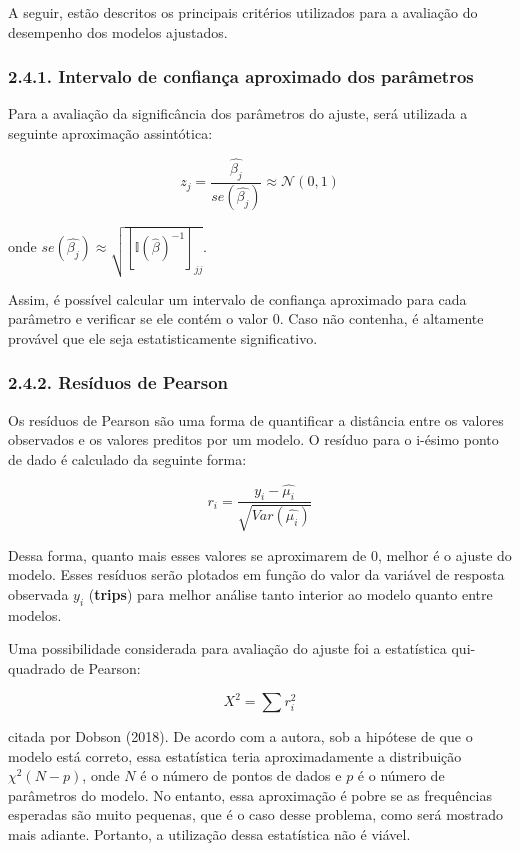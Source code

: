 \documentclass[
]{article}
\begin{document}
A seguir, estão descritos os principais critérios utilizados para a
avaliação do desempenho dos modelos ajustados.

\subsubsection{2.4.1. Intervalo de confiança aproximado dos
parâmetros}\label{intervalo-de-confianuxe7a-aproximado-dos-paruxe2metros}

Para a avaliação da significância dos parâmetros do ajuste, será
utilizada a seguinte aproximação assintótica:

\[
z_j = \dfrac{\hat{\beta_j}}{se(\hat{\beta_j})} \approx \mathcal{N}(0, 1)
\]

onde
\(se(\hat{\beta_j}) \approx \sqrt{[\mathbb{I}(\hat{\beta})^{-1}]_{jj}}\).

Assim, é possível calcular um intervalo de confiança aproximado para
cada parâmetro e verificar se ele contém o valor 0. Caso não contenha, é
altamente provável que ele seja estatisticamente significativo.

\subsubsection{2.4.2. Resíduos de Pearson}\label{resuxedduos-de-pearson}

Os resíduos de Pearson são uma forma de quantificar a distância entre os
valores observados e os valores preditos por um modelo. O resíduo para o
i-ésimo ponto de dado é calculado da seguinte forma:

\[
r_i = \dfrac{y_i - \hat{\mu_i}}{\sqrt{Var(\hat{\mu_i})}}
\]

Dessa forma, quanto mais esses valores se aproximarem de 0, melhor é o
ajuste do modelo. Esses resíduos serão plotados em função do valor da
variável de resposta observada \(y_i\) (\textbf{trips}) para melhor
análise tanto interior ao modelo quanto entre modelos.

Uma possibilidade considerada para avaliação do ajuste foi a estatística
qui-quadrado de Pearson:

\[
X^2 = \sum r_i^2
\]

citada por Dobson (2018). De acordo com a autora, sob a hipótese de que
o modelo está correto, essa estatística teria aproximadamente a
distribuição \(\chi^2(N-p)\), onde \(N\) é o número de pontos de dados e
\(p\) é o número de parâmetros do modelo. No entanto, essa aproximação é
pobre se as frequências esperadas são muito pequenas, que é o caso desse
problema, como será mostrado mais adiante. Portanto, a utilização dessa
estatística não é viável.
\end{document}
